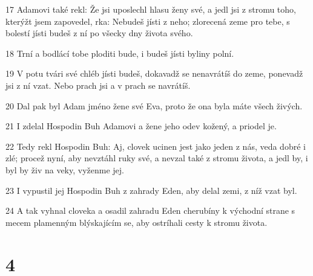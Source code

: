 \par 17 Adamovi také rekl: Že jsi uposlechl hlasu ženy své, a jedl jsi z stromu toho, kterýžt jsem zapovedel, rka: Nebudeš jísti z neho; zlorecená zeme pro tebe, s bolestí jísti budeš z ní po všecky dny života svého.
\par 18 Trní a bodlácí tobe ploditi bude, i budeš jísti byliny polní.
\par 19 V potu tvári své chléb jísti budeš, dokavadž se nenavrátíš do zeme, ponevadž jsi z ní vzat. Nebo prach jsi a v prach se navrátíš.
\par 20 Dal pak byl Adam jméno žene své Eva, proto že ona byla máte všech živých.
\par 21 I zdelal Hospodin Buh Adamovi a žene jeho odev kožený, a priodel je.
\par 22 Tedy rekl Hospodin Buh: Aj, clovek ucinen jest jako jeden z nás, veda dobré i zlé; procež nyní, aby nevztáhl ruky své, a nevzal také z stromu života, a jedl by, i byl by živ na veky, vyženme jej.
\par 23 I vypustil jej Hospodin Buh z zahrady Eden, aby delal zemi, z níž vzat byl.
\par 24 A tak vyhnal cloveka a osadil zahradu Eden cherubíny k východní strane s mecem plamenným blýskajícím se, aby ostríhali cesty k stromu života.

\chapter{4}

